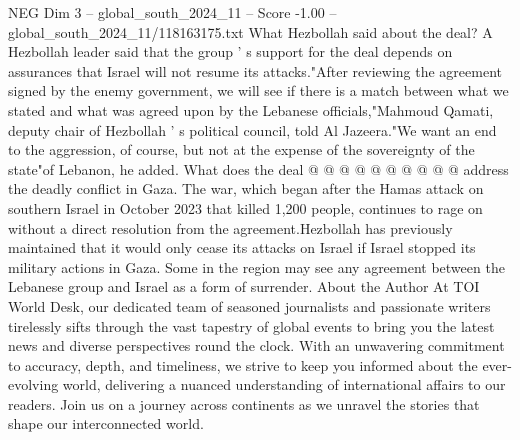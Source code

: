 \begin{textsample}{NEG Dim 3 – global\_south\_2024\_11 – Score -1.00 – global\_south\_2024\_11/118163175.txt}
What Hezbollah said about the deal?
A Hezbollah leader said that the group ' s support for the deal depends on assurances that Israel will not resume its attacks."After reviewing the agreement signed by the enemy government, we will see if there is a match between what we stated and what was agreed upon by the Lebanese officials,"Mahmoud Qamati, deputy chair of Hezbollah ' s political council, told Al Jazeera."We want an end to the aggression, of course, but not at the expense of the sovereignty of the state"of Lebanon, he added.
What does the deal @ @ @ @ @ @ @ @ @ @ address the deadly conflict in Gaza.
The war, which began after the Hamas attack on southern Israel in October 2023 that killed 1,200 people, continues to rage on without a direct resolution from the agreement.Hezbollah has previously maintained that it would only cease its attacks on Israel if Israel stopped its military actions in Gaza.
Some in the region may see any agreement between the Lebanese group and Israel as a form of surrender.
About the Author At TOI World Desk, our dedicated team of seasoned journalists and passionate writers tirelessly sifts through the vast tapestry of global events to bring you the latest news and diverse perspectives round the clock.
With an unwavering commitment to accuracy, depth, and timeliness, we strive to keep you informed about the ever-evolving world, delivering a nuanced understanding of international affairs to our readers.
Join us on a journey across continents as we unravel the stories that shape our interconnected world.

\end{textsample}
